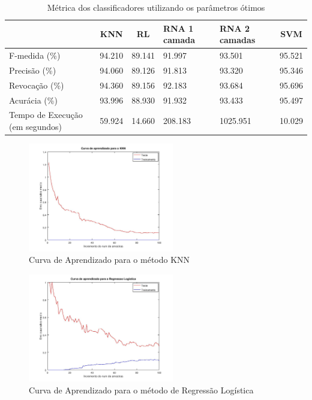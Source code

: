 \documentclass[10pt, conference, compsocconf]{IEEEtran}
\begin{document}
\begin{table}[!t]
\renewcommand{\arraystretch}{1.3}
\caption{Métrica dos classificadores utilizando os parâmetros ótimos}
\label{metrica_otimos}
\centering
\begin{tabular}{|p{1.8cm}|c|c|p{1cm}|p{1cm}|c|}
\hline
    & KNN & RL & RNA 1 camada & RNA 2
    camadas & SVM\\
\hline
F-medida (\%) & 94.210 & 89.141 & 91.997 & 93.501 & 95.521 \\
Precisão (\%) & 94.060 & 89.126 & 91.813 & 93.320 & 95.346 \\
Revocação (\%) & 94.360 & 89.156 & 92.183 & 93.684 & 95.696 \\
Acurácia (\%) & 93.996 & 88.930 & 91.932 & 93.433 & 95.497 \\
Tempo de Execução (em segundos) & 59.924 & 14.660 & 208.183 & 1025.951 & 10.029 \\
\hline
\end{tabular}
\end{table}


\begin{figure}[!t]
\centering
\includegraphics[width=2.5in]{imgs/KNNcurve}
\caption{Curva de Aprendizado para o método KNN}
\label{fig:knn_curve}
\end{figure}

\begin{figure}[!t]
\centering
\includegraphics[width=2.5in]{imgs/RLcurve}
\caption{Curva de Aprendizado para o método de Regressão Logística}
\label{fig:rl_curve}
\end{figure}
\end{document}
